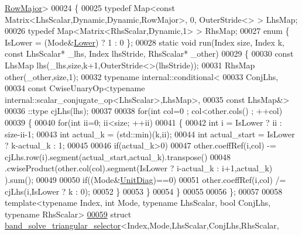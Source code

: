 \begin{DoxyCode}
      \hyperlink{group__enums_ggaacded1a18ae58b0f554751f6cdf9eb13acfcde9cd8677c5f7caf6bd603666aae3}{RowMajor}>
00024 \{
00025   \textcolor{keyword}{typedef} Map<const Matrix<LhsScalar,Dynamic,Dynamic,RowMajor>, 0, OuterStride<> > LhsMap;
00026   \textcolor{keyword}{typedef} Map<Matrix<RhsScalar,Dynamic,1> > RhsMap;
00027   \textcolor{keyword}{enum} \{ IsLower = (Mode&\hyperlink{group__enums_gga39e3366ff5554d731e7dc8bb642f83cda891792b8ed394f7607ab16dd716f60e6}{Lower}) ? 1 : 0 \};
00028   \textcolor{keyword}{static} \textcolor{keywordtype}{void} run(Index size, Index k, \textcolor{keyword}{const} LhsScalar* \_lhs, Index lhsStride, RhsScalar* \_other)
00029   \{
00030     \textcolor{keyword}{const} LhsMap lhs(\_lhs,size,k+1,OuterStride<>(lhsStride));
00031     RhsMap other(\_other,size,1);
00032     \textcolor{keyword}{typename} internal::conditional<
00033                           ConjLhs,
00034                           \textcolor{keyword}{const} CwiseUnaryOp<typename internal::scalar\_conjugate\_op<LhsScalar>,LhsMap>,
00035                           \textcolor{keyword}{const} LhsMap&>
00036                         ::type cjLhs(lhs);
00037                         
00038     \textcolor{keywordflow}{for}(\textcolor{keywordtype}{int} col=0 ; col<other.cols() ; ++col)
00039     \{
00040       \textcolor{keywordflow}{for}(\textcolor{keywordtype}{int} ii=0; ii<size; ++ii)
00041       \{
00042         \textcolor{keywordtype}{int} i = IsLower ? ii : size-ii-1;
00043         \textcolor{keywordtype}{int} actual\_k = (std::min)(k,ii);
00044         \textcolor{keywordtype}{int} actual\_start = IsLower ? k-actual\_k : 1;
00045         
00046         \textcolor{keywordflow}{if}(actual\_k>0)
00047           other.coeffRef(i,col) -= cjLhs.row(i).segment(actual\_start,actual\_k).transpose()
00048                                   .cwiseProduct(other.col(col).segment(IsLower ? i-actual\_k : i+1,actual\_k)
      ).sum();
00049 
00050         \textcolor{keywordflow}{if}((Mode&\hyperlink{group__enums_gga39e3366ff5554d731e7dc8bb642f83cdaddb72f888ac85d5a1c52333e54f9374b}{UnitDiag})==0)
00051           other.coeffRef(i,col) /= cjLhs(i,IsLower ? k : 0);
00052       \}
00053     \}
00054   \}
00055   
00056 \};
00057 
00058 \textcolor{keyword}{template}<\textcolor{keyword}{typename} Index, \textcolor{keywordtype}{int} Mode, \textcolor{keyword}{typename} LhsScalar, \textcolor{keywordtype}{bool} ConjLhs, \textcolor{keyword}{typename} RhsScalar>
\hyperlink{structinternal_1_1band__solve__triangular__selector_3_01_index_00_01_mode_00_01_lhs_scalar_00_0137de00cf99d429d0f5d51514cfce90a6}{00059} \textcolor{keyword}{struct }\hyperlink{structinternal_1_1band__solve__triangular__selector}{band\_solve\_triangular\_selector}<Index,Mode,LhsScalar,ConjLhs,RhsScalar,

\end{DoxyCode}
